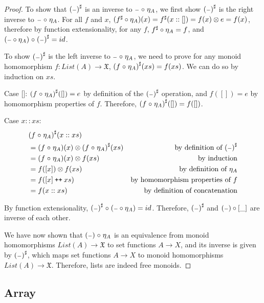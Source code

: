 \begin{proof}
    To show that ${({\scriptstyle{-}})}^{\sharp}$ is an inverse to ${\scriptstyle{-}} \mathrel{\circ} \eta_A$,
    we first show ${({\scriptstyle{-}})}^{\sharp}$ is the right inverse to ${\scriptstyle{-}} \mathrel{\circ} \eta_A$.
    For all $f$ and $x$, $({f}^{\sharp} \circ \eta_A)(x) = {f}^{\sharp}(x :: []) = f(x) \otimes e = f(x)$,
    therefore by function extensionality, for any $f$, ${f}^{\sharp} \circ \eta_A = f$,
    and $({\scriptstyle{-}} \circ \eta_A) \mathrel{\circ} {({\scriptstyle{-}})}^{\sharp} = id$.
    
    To show ${({\scriptstyle{-}})}^{\sharp}$ is the left inverse to ${\scriptstyle{-}} \mathrel{\circ} \eta_A$, we need to prove
    for any monoid homomorphism $f : List(A) \to \mathfrak{X}$, ${(f \mathrel{\circ} \eta_A)}^{\sharp}(xs) = f(xs)$.
    We can do so by induction on $xs$.

    Case []: ${(f \mathrel{\circ} \eta_A)}^{\sharp}([]) = e$ by definition of the ${({\scriptstyle{-}})}^{\sharp}$ operation,
    and $f([]) = e$ by homomorphism properties of $f$. Therefore, ${(f \mathrel{\circ} \eta_A)}^{\sharp}([]) = f([])$.

    Case $x :: xs$: 
    \begin{align*}
        & {(f \mathrel{\circ} \eta_A)}^{\sharp}(x :: xs) \\
        & = (f \mathrel{\circ} \eta_A)(x) \otimes {(f \mathrel{\circ}\eta_A)}^{\sharp}(xs) & \text{by definition of ${({\scriptstyle{-}})}^{\sharp}$} \\
        & = (f \mathrel{\circ} \eta_A)(x) \otimes f(xs) & \text{by induction} \\
        & = f([x]) \otimes f(xs) & \text{by definition of $\eta_A$} \\
        & = f([x] \mathbin{\text{\ttfamily\upshape ++}} xs) & \text{by homomorphism properties of $f$} \\
        & = f(x :: xs) & \text{by definition of concatenation}
    \end{align*}

    By function extensionality, ${({\scriptstyle{-}})}^{\sharp} \mathrel{\circ} ({\scriptstyle{-}} \circ \eta_A) = id$.
    Therefore, ${({\scriptstyle{-}})}^{\sharp}$ and $({\scriptstyle{-}}) \circ [\_]$ are inverse of each other.

    We have now shown that $({\scriptstyle{-}}) \mathrel{\circ} \eta_A$ is an equivalence from monoid homomorphisms $List(A) \to \mathfrak{X}$
    to set functions $A \to X$, and its inverse is given by ${({\scriptstyle{-}})}^{\sharp}$, which maps set
    functions $A \to X$ to monoid homomorphisms $List(A) \to \mathfrak{X}$. Therefore, lists are indeed
    free monoids.
    
\end{proof}
\subsection{Array}

